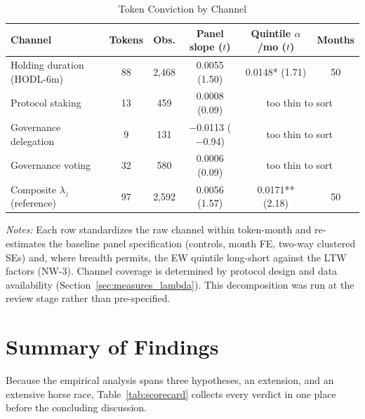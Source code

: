 \documentclass[12pt]{article}
\begin{document}
\begin{table}[ht]
\centering
\caption{Token Conviction by Channel}
\label{tab:channels}
\small
\begin{tabular}{lccccc}
\toprule
Channel & Tokens & Obs. & Panel slope ($t$) & Quintile $\alpha$/mo ($t$) & Months \\
\midrule
Holding duration (HODL-6m) & 88 & 2,468 & 0.0055 (1.50) & 0.0148* (1.71) & 50 \\
Protocol staking & 13 & 459 & 0.0008 (0.09) & \multicolumn{2}{c}{too thin to sort} \\
Governance delegation & 9 & 131 & $-$0.0113 ($-$0.94) & \multicolumn{2}{c}{too thin to sort} \\
Governance voting & 32 & 580 & 0.0006 (0.09) & \multicolumn{2}{c}{too thin to sort} \\
\midrule
Composite $\lambda_z$ (reference) & 97 & 2,592 & 0.0056 (1.57) & 0.0171** (2.18) & 50 \\
\bottomrule
\end{tabular}
\smallskip

\parbox{0.9\linewidth}{\footnotesize
\textit{Notes:} Each row standardizes the raw channel within token-month and
re-estimates the baseline panel specification (controls, month FE, two-way clustered
SEs) and, where breadth permits, the EW quintile long-short against the LTW factors
(NW-3). Channel coverage is determined by protocol design and data availability
(Section~\ref{sec:measures_lambda}). This decomposition was run at the review stage
rather than pre-specified.}
\end{table}

\FloatBarrier
\section{Summary of Findings}
\label{sec:summary}

Because the empirical analysis spans three hypotheses, an extension, and an extensive
horse race, Table~\ref{tab:scorecard} collects every verdict in one place before the
concluding discussion.
\end{document}
